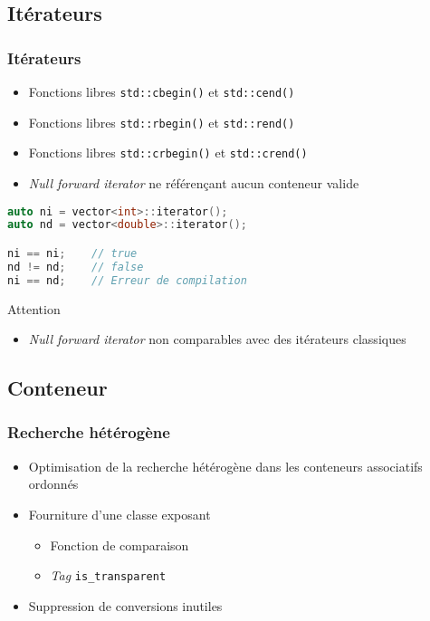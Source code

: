 \documentclass[C++.tex]{subfiles}
\begin{document}
\subsection*{Itérateurs}
\begin{frame}[fragile]
	\frametitle{Itérateurs}
	\begin{itemize}
		\item Fonctions libres \lstinline|std::cbegin()| et \lstinline|std::cend()|
		\item Fonctions libres \lstinline|std::rbegin()| et \lstinline|std::rend()|
		\item Fonctions libres \lstinline|std::crbegin()| et \lstinline|std::crend()|
		\item \textit{Null forward iterator} ne référençant aucun conteneur valide
	\end{itemize}

	\begin{lstlisting}[language=C++]
auto ni = vector<int>::iterator();
auto nd = vector<double>::iterator();

ni == ni;    // true
nd != nd;    // false
ni == nd;    // Erreur de compilation\end{lstlisting}

	\begin{alertblock}{Attention}
		\begin{itemize}
			\item \textit{Null forward iterator} non comparables avec des itérateurs \og classiques\fg{}
		\end{itemize}

	\end{alertblock}
\end{frame}

\subsection*{Conteneur}
\begin{frame}[fragile]
	\frametitle{Recherche hétérogène}
	\begin{itemize}
		\item Optimisation de la recherche hétérogène dans les conteneurs associatifs ordonnés
		\item Fourniture d'une classe exposant
		\begin{itemize}
			\item Fonction de comparaison
			\item \textit{Tag} \lstinline|is_transparent|
		\end{itemize}
		\item Suppression de conversions inutiles
	\end{itemize}
\end{frame}
\end{document}
